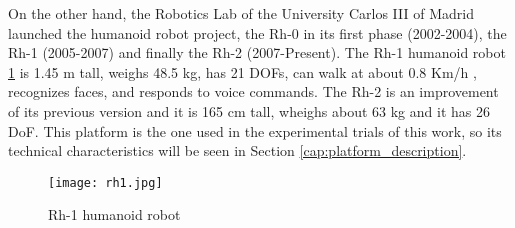 On the other hand, the Robotics Lab of the University Carlos III of Madrid launched the humanoid robot project, the Rh-0 in its first phase (2002-2004), the Rh-1 (2005-2007) and finally the Rh-2 (2007-Present). The Rh-1 humanoid robot \ref{fig:rh} is 1.45 m tall, weighs 48.5 kg, has 21 DOFs, can walk at about 0.8 Km/h \cite{Arbulu2005}, recognizes faces, and responds to voice commands. The Rh-2 is an improvement of its previous version and it is 165 cm tall, wheighs about 63 kg and it has 26 DoF. This platform is the one used in the experimental trials of this work, so its technical characteristics will be seen in Section \ref{cap:platform_description}.



\begin{figure}[!hbt]
\centering
\texttt{[image: rh1.jpg]}
\caption{Rh-1 humanoid robot}
\label{fig:rh}
\end{figure}
